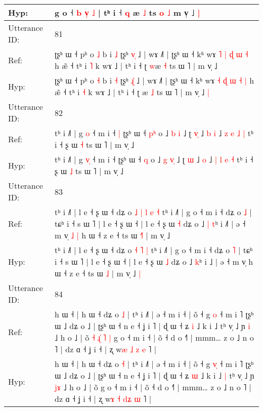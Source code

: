 \documentclass[10pt]{article}
\DeclareRobustCommand{\hl}[1]{{\textcolor{red}{#1}}}
\begin{document}
\begin{longtable}{ll}
 \\
Hyp: & g o ˧ \hl{b} \hl{v}\hl{̩} \hl{˩} | tʰ i ˧ \hl{q} \hl{}æ \hl{˩} ts\hl{}\hl{} \hl{o} \hl{˩} m v̩ ˩\hl{ }\hl{|}
 \\
\midrule
Utterance ID: & 81 \\
Ref: & ʈʂʰ ɯ ˧ pʰ o \hl{˩} b i \hl{˩} ʈʂʰ \hl{v}\hl{̩} ˩ | wɤ ˩˥ | ʈʂʰ ɯ ˧ kʰ wɤ \hl{˥} \hl{|} \hl{ɖ} \hl{ɯ} \hl{˧} h æ̃ ˧ tʰ i \hl{˥} k wɤ ˩ | tʰ i ˧ ʈ \hl{w}æ \hl{˧} ts ɯ ˥ | m v̩ ˩\hl{}\hl{}
 \\
Hyp: & ʈʂʰ ɯ ˧ pʰ o \hl{˧} b i \hl{˧} ʈʂʰ \hl{ɻ}\hl{̍} ˩ | wɤ ˩˥ | ʈʂʰ ɯ ˧ kʰ wɤ \hl{˧} \hl{ɖ} \hl{ɯ} \hl{˧} \hl{|} h æ̃ ˧ tʰ i \hl{˧} k wɤ ˩ | tʰ i ˧ ʈ \hl{}æ \hl{˩} ts ɯ ˥ | m v̩ ˩\hl{ }\hl{|}
 \\
\midrule
Utterance ID: & 82 \\
Ref: & tʰ i ˩˥ | g \hl{}\hl{o} ˧ m i ˧\hl{ }\hl{|} ʈʂʰ ɯ ˧ \hl{p}\hl{ʰ} o ˩ \hl{b} \hl{}\hl{i} ˩ ʈ \hl{v}\hl{̩} ˩\hl{ }\hl{b} \hl{i} ˩ \hl{z} \hl{e} \hl{˩} \hl{|} tʰ i ˧ ʂ ɯ \hl{˧} ts ɯ ˥ | m v̩ ˩
 \\
Hyp: & tʰ i ˩˥ | g \hl{v}\hl{̩} ˧ m i ˧\hl{}\hl{} ʈʂʰ ɯ ˧ \hl{}\hl{q} o ˩ \hl{g} \hl{v}\hl{̩} ˩ ʈ \hl{}\hl{ɯ} ˩\hl{}\hl{} \hl{o} ˩ \hl{|} \hl{l} \hl{e} \hl{˧} tʰ i ˧ ʂ ɯ \hl{˩} ts ɯ ˥ | m v̩ ˩
 \\
\midrule
Utterance ID: & 83 \\
Ref: & tʰ i ˩˥ | l e ˧ ʂ ɯ ˧ dʑ o\hl{ }\hl{˩}\hl{ }\hl{|} \hl{l} \hl{e} \hl{˧} tʰ i ˩˥ | g o ˧ m i ˧ dʑ o \hl{˩} | tɕʰ i ˧ s ɯ ˥ | l e ˧ ʂ ɯ ˧ | l e ˧ ʂ ɯ \hl{˧} dʑ o ˩\hl{ }\hl{|} \hl{t}ʰ i ˩\hl{˥} | ə ˧ m v̩\hl{ }\hl{˩}\hl{ }\hl{|} h ɯ ˧ z e ˧ ts ɯ \hl{˧}\hl{˥} | m v̩ ˩\hl{}\hl{}
 \\
Hyp: & tʰ i ˩˥ | l e ˧ ʂ ɯ ˧ dʑ o\hl{}\hl{}\hl{}\hl{} \hl{˧} \hl{˥} \hl{|} tʰ i ˩˥ | g o ˧ m i ˧ dʑ o \hl{˥} | tɕʰ i ˧ s ɯ ˥ | l e ˧ ʂ ɯ ˧ | l e ˧ ʂ ɯ \hl{˩} dʑ o ˩\hl{}\hl{} \hl{k}ʰ i ˩\hl{} | ə ˧ m v̩\hl{}\hl{}\hl{}\hl{} h ɯ ˧ z e ˧ ts ɯ \hl{}\hl{˩} | m v̩ ˩\hl{ }\hl{|}
 \\
\midrule
Utterance ID: & 84 \\
Ref: & h ɯ ˧ | h ɯ ˧ dʑ o \hl{˩} | tʰ i ˩˥ | ə ˧ m i ˧ | õ ˧ g \hl{}\hl{o} ˧ m i ˥ ʈʂʰ ɯ ˩ dʑ o ˩ | ʈʂʰ ɯ ˧ n e ˧ ʝ i ˥ | ɖ ɯ ˧ ʑ \hl{i} ˩ k i ˩\hl{}\hl{} tʰ v̩ ˩ ɲ \hl{}\hl{i} ˩ h o ˩ | õ\hl{ }\hl{˧}\hl{ }\hl{ɻ}\hl{̍}\hl{ }\hl{˥}\hl{ }\hl{|} g o ˧ m i ˧ | õ ˧ d o ˧˥ | mmm… z o ˩ n o ˥ | dz ɑ ˧ ʝ i ˧ | ʐ w\hl{æ} \hl{˩} \hl{}\hl{z} \hl{e} ˥ |
 \\
Hyp: & h ɯ ˧ | h ɯ ˧ dʑ o \hl{˧} | tʰ i ˩˥ | ə ˧ m i ˧ | õ ˧ g \hl{v}\hl{̩} ˧ m i ˥ ʈʂʰ ɯ ˩ dʑ o ˩ | ʈʂʰ ɯ ˧ n e ˧ ʝ i ˥ | ɖ ɯ ˧ ʑ \hl{ɯ} ˩ k i ˩\hl{ }\hl{|} tʰ v̩ ˩ ɲ \hl{j}\hl{ɤ} ˩ h o ˩ | õ\hl{}\hl{}\hl{}\hl{}\hl{}\hl{}\hl{}\hl{}\hl{} g o ˧ m i ˧ | õ ˧ d o ˧˥ | mmm… z o ˩ n o ˥ | dz ɑ ˧ ʝ i ˧ | ʐ w\hl{ɤ} \hl{˧} \hl{d}\hl{ʑ} \hl{ɯ} ˥ |

\end{longtable}
\end{document}
